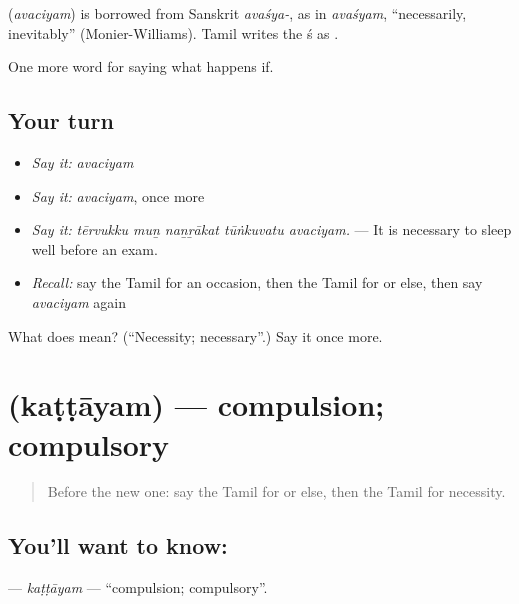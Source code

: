 \begin{cousinweb}
\textbf{} (\emph{avaciyam}) is borrowed from Sanskrit \emph{avaśya-}, as in \emph{avaśyam}, \textquotedblleft{}necessarily, inevitably\textquotedblright{} (Monier-Williams). Tamil writes the ś as .
\end{cousinweb}

\begin{grammarlens}[title={What you've built}]
One more word for saying what happens if.
\end{grammarlens}

\subsection*{Your turn}
\begin{itemize}
\raggedright
  \item \emph{Say it:} \emph{avaciyam}
  \item \emph{Say it:} \emph{avaciyam}, once more
  \item \emph{Say it:} \emph{tērvukku muṉ naṉṟākat tūṅkuvatu avaciyam.} — It is necessary to sleep well before an exam.
  \item \emph{Recall:} say the Tamil for an occasion, then the Tamil for or else, then say \emph{avaciyam} again
\end{itemize}

\begin{tcolorbox}[breakable,colback=teal!4,colframe=teal!35!black,title={Before you move on}]
What does  mean? (\textquotedblleft{}Necessity; necessary\textquotedblright{}.) Say it once more.
\end{tcolorbox}
\section[\texorpdfstring{\ta{கட்டாயம்} (kaṭṭāyam)}{கட்டாயம் (kaṭṭāyam)}]{ (kaṭṭāyam) — compulsion; compulsory}

\label{lesson:TA-C384-kattayam}



\begin{quote}
Before the new one: say the Tamil for or else, then the Tamil for necessity.
\end{quote}

\subsection*{You'll want to know: }
\textbf{} — \emph{kaṭṭāyam} — \textquotedblleft{}compulsion; compulsory\textquotedblright{}.

